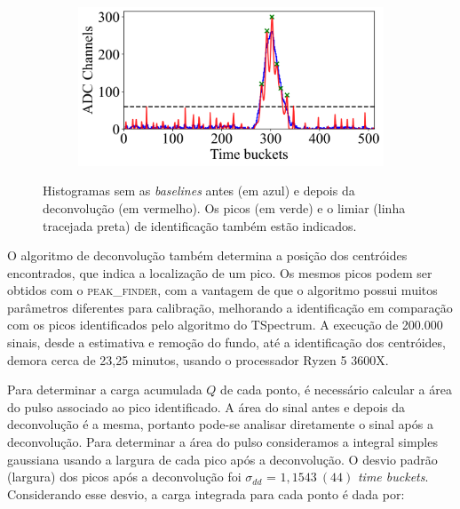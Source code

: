 \documentclass[a4paper,12pt,oneside]{book}
\begin{document}
\begin{figure}[H]
\begin{subfigure}[b]{0.48\textwidth}
        \caption{}
        \label{subfig:ex_sinal_deconv_3}
    \end{subfigure}%
    \hfill
    \begin{subfigure}[b]{0.48\textwidth}
        \centering
        \includegraphics[scale=0.40]{figs/ex_deconv_4.png}
        \caption{}
        \label{subfig:ex_sinal_deconv_4}
    \end{subfigure}
\caption{Histogramas sem as \textit{baselines} antes (em azul) e depois da deconvolução (em vermelho). Os picos (em verde) e o limiar (linha tracejada preta) de identificação também estão indicados.}
\label{fig:ex_sinal_deconv}
\end{figure}

\par O algoritmo de deconvolução também determina a posição dos centróides encontrados, que indica a localização de um pico. Os mesmos picos podem ser obtidos com o \textsc{peak\_finder}, com a vantagem de que o algoritmo possui muitos parâmetros diferentes para calibração, melhorando a identificação em comparação com os picos identificados pelo algoritmo do TSpectrum. A execução de 200.000 sinais, desde a estimativa e remoção do fundo, até a identificação dos centróides, demora cerca de 23,25 minutos, usando o processador Ryzen 5 3600X.

\par Para determinar a carga acumulada $Q$ de cada ponto, é necessário calcular a área do pulso associado ao pico identificado. A área do sinal antes e depois da deconvolução é a mesma, portanto pode-se analisar diretamente o sinal após a deconvolução. Para determinar a área do pulso consideramos a integral simples gaussiana usando a largura de cada pico após a deconvolução. O desvio padrão (largura) dos picos após a deconvolução foi $\sigma_{dd}$ = $1,1543~(44)$ \textit{time buckets}. Considerando esse desvio, a carga integrada para cada ponto é dada por:
\end{document}
